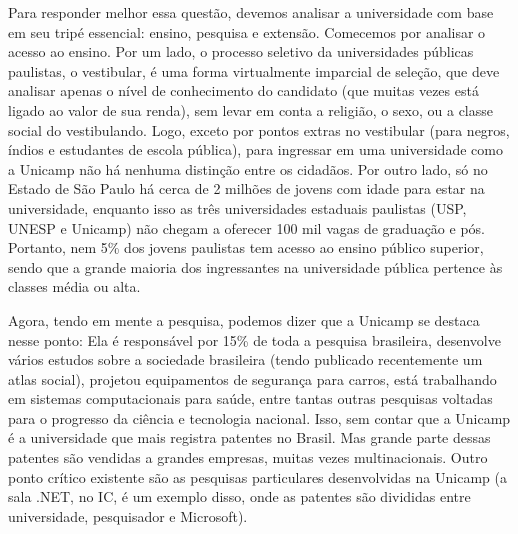 Para responder melhor essa questão, devemos analisar a universidade com base em
seu tripé essencial: ensino, pesquisa e extensão. Comecemos por analisar o
acesso ao ensino. Por um lado, o processo seletivo da universidades públicas
paulistas, o vestibular, é uma forma virtualmente imparcial de seleção, que deve
analisar apenas o nível de conhecimento do candidato (que muitas vezes está
ligado ao valor de sua renda), sem levar em conta a religião, o sexo, ou a
classe social do vestibulando. Logo, exceto por pontos extras no vestibular
(para negros, índios e estudantes de escola pública), para ingressar em uma
universidade como a Unicamp não há nenhuma distinção entre os cidadãos. Por
outro lado, só no Estado de São Paulo há cerca de 2 milhões de jovens com idade
para estar na universidade, enquanto isso as três universidades estaduais
paulistas (USP, UNESP e Unicamp) não chegam a oferecer 100 mil vagas de
graduação e pós. Portanto, nem 5\% dos jovens paulistas tem acesso ao ensino
público superior, sendo que a grande maioria dos ingressantes na universidade
pública pertence às classes média ou alta.

Agora, tendo em mente a pesquisa, podemos dizer que a Unicamp se destaca nesse
ponto: Ela é responsável por 15\% de toda a pesquisa brasileira, desenvolve
vários estudos sobre a sociedade brasileira (tendo publicado recentemente um
atlas social), projetou equipamentos de segurança para carros, está trabalhando
em sistemas computacionais para saúde, entre tantas outras pesquisas voltadas
para o progresso da ciência e tecnologia nacional. Isso, sem contar que a
Unicamp é a universidade que mais registra patentes no Brasil. Mas grande parte
dessas patentes são vendidas a grandes empresas, muitas vezes multinacionais.
Outro ponto crítico existente são as pesquisas particulares desenvolvidas na
Unicamp (a sala .NET, no IC, é um exemplo disso, onde as patentes são divididas
entre universidade, pesquisador e Microsoft).

